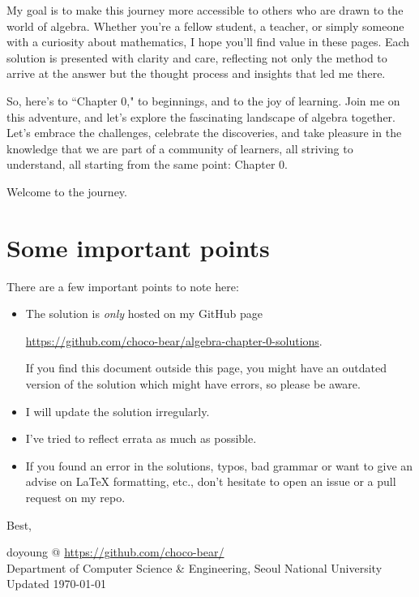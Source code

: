 My goal is to make this journey more accessible to others who are drawn to the world of algebra. Whether you're a fellow student, a teacher, or simply someone with a curiosity about mathematics, I hope you'll find value in these pages. Each solution is presented with clarity and care, reflecting not only the method to arrive at the answer but the thought process and insights that led me there.

So, here's to ``Chapter 0," to beginnings, and to the joy of learning. Join me on this adventure, and let's explore the fascinating landscape of algebra together. Let's embrace the challenges, celebrate the discoveries, and take pleasure in the knowledge that we are part of a community of learners, all striving to understand, all starting from the same point: Chapter 0.

Welcome to the journey.

\newpage
\section*{Some important points}
There are a few important points to note here:
\begin{itemize}
    \item The solution is \emph{only} hosted on my GitHub page
        \begin{center}
		  \href{https://github.com/choco-bear/algebra-chapter-0-solutions}{https://github.com/choco-bear/algebra-chapter-0-solutions}.
        \end{center} 
        If you find this document outside this page, you might have an outdated version of the solution which might have errors, so please be aware.
    \item I will update the solution irregularly.
    \item I've tried to reflect errata as much as possible.
    \item If you found an error in the solutions, typos, bad grammar or want to give an advise on LaTeX formatting, etc., don't hesitate to open an issue or a pull request on my repo. 
\end{itemize}

Best,

\begin{flushright}
doyoung @ \href{https://github.com/choco-bear/}{https://github.com/choco-bear/} \\
Department of Computer Science \& Engineering, Seoul National University \\
Updated \specialdate\today
\end{flushright}
